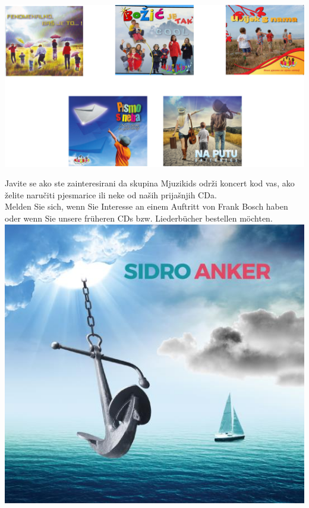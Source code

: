 \documentclass[a4paper,twoside, svgnames]{article}
\begin{document}
\begin{center}
\vspace{1cm}
\includegraphics[width=\linewidth]{images/cd}

\vspace{1cm}
Javite se ako ste zainteresirani da skupina Mjuzikids održi koncert kod vas,
ako želite naručiti pjesmarice ili neke od naših prijašnjih CDa.\\
\vspace{1cm}
Melden Sie sich, wenn Sie Interesse an einem Auftritt von Frank Bosch haben oder
wenn Sie unsere früheren CDs bzw. Liederbücher bestellen möchten.
\vfill
\includegraphics[width=0.5\linewidth]{images/Sidro_cd}
\vfill

\end{center}

\newpage
\end{document}
